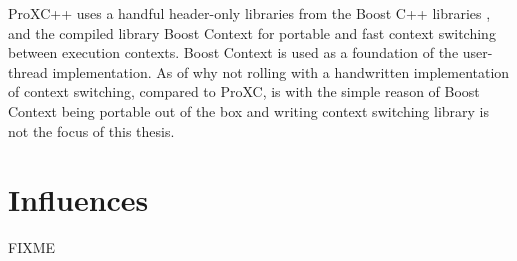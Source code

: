 ProXC++ uses a handful header\hyp{}only libraries from the Boost C++ libraries \citep{boost2017boost}, and the compiled library Boost Context \citep{kowalke2017boost} for portable and fast context switching between execution contexts. Boost Context is used as a foundation of the user\hyp{}thread implementation. As of why not rolling with a handwritten implementation of context switching, compared to ProXC, is with the simple reason of Boost Context being portable out of the box and writing context switching library is not the focus of this thesis.


\section{Influences}
\label{sec:influences}

FIXME
